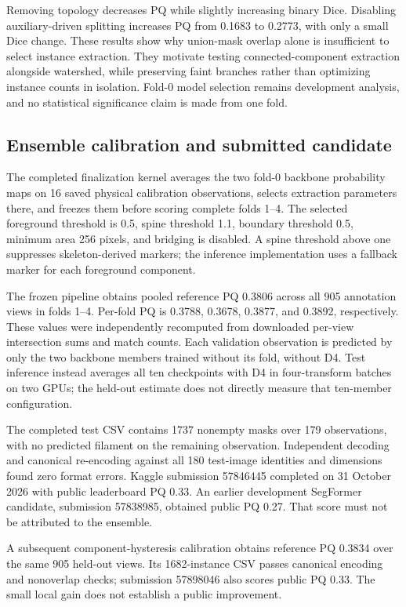 \documentclass[conference]{IEEEtran}
\begin{document}
Removing topology decreases PQ while slightly increasing binary Dice. Disabling auxiliary-driven splitting increases PQ from 0.1683 to 0.2773, with only a small Dice change. These results show why union-mask overlap alone is insufficient to select instance extraction. They motivate testing connected-component extraction alongside watershed, while preserving faint branches rather than optimizing instance counts in isolation. Fold-0 model selection remains development analysis, and no statistical significance claim is made from one fold.

\subsection{Ensemble calibration and submitted candidate}
The completed finalization kernel averages the two fold-0 backbone probability maps on 16 saved physical calibration observations, selects extraction parameters there, and freezes them before scoring complete folds 1--4. The selected foreground threshold is 0.5, spine threshold 1.1, boundary threshold 0.5, minimum area 256 pixels, and bridging is disabled. A spine threshold above one suppresses skeleton-derived markers; the inference implementation uses a fallback marker for each foreground component.

The frozen pipeline obtains pooled reference PQ 0.3806 across all 905 annotation views in folds 1--4. Per-fold PQ is 0.3788, 0.3678, 0.3877, and 0.3892, respectively. These values were independently recomputed from downloaded per-view intersection sums and match counts. Each validation observation is predicted by only the two backbone members trained without its fold, without D4. Test inference instead averages all ten checkpoints with D4 in four-transform batches on two GPUs; the held-out estimate does not directly measure that ten-member configuration.

The completed test CSV contains 1737 nonempty masks over 179 observations, with no predicted filament on the remaining observation. Independent decoding and canonical re-encoding against all 180 test-image identities and dimensions found zero format errors. Kaggle submission 57846445 completed on 31 October 2026 with public leaderboard PQ 0.33. An earlier development SegFormer candidate, submission 57838985, obtained public PQ 0.27. That score must not be attributed to the ensemble.

A subsequent component-hysteresis calibration obtains reference PQ 0.3834 over the same 905 held-out views. Its 1682-instance CSV passes canonical encoding and nonoverlap checks; submission 57898046 also scores public PQ 0.33. The small local gain does not establish a public improvement.
\end{document}
